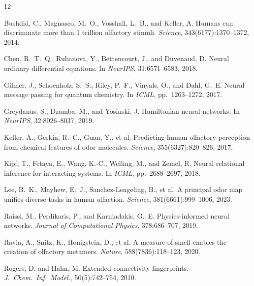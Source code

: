 \documentclass[11pt,a4paper]{article}
\begin{document}
\begin{thebibliography}{12}

Bushdid, C., Magnasco, M.~O., Vosshall, L.~B., and Keller, A.
\newblock Humans can discriminate more than 1 trillion olfactory stimuli.
\newblock \textit{Science}, 343(6177):1370--1372, 2014.

Chen, R.~T.~Q., Rubanova, Y., Bettencourt, J., and Duvenaud, D.
\newblock Neural ordinary differential equations.
\newblock In \textit{NeurIPS}, 31:6571--6583, 2018.

Gilmer, J., Schoenholz, S.~S., Riley, P.~F., Vinyals, O., and Dahl, G.~E.
\newblock Neural message passing for quantum chemistry.
\newblock In \textit{ICML}, pp.~1263--1272, 2017.

Greydanus, S., Dzamba, M., and Yosinski, J.
\newblock Hamiltonian neural networks.
\newblock In \textit{NeurIPS}, 32:8026--8037, 2019.

Keller, A., Gerkin, R.~C., Guan, Y., et al.
\newblock Predicting human olfactory perception from chemical features of odor molecules.
\newblock \textit{Science}, 355(6327):820--826, 2017.

Kipf, T., Fetaya, E., Wang, K.-C., Welling, M., and Zemel, R.
\newblock Neural relational inference for interacting systems.
\newblock In \textit{ICML}, pp.~2688--2697, 2018.

Lee, B.~K., Mayhew, E.~J., Sanchez-Lengeling, B., et al.
\newblock A principal odor map unifies diverse tasks in human olfaction.
\newblock \textit{Science}, 381(6661):999--1006, 2023.

Raissi, M., Perdikaris, P., and Karniadakis, G.~E.
\newblock Physics-informed neural networks.
\newblock \textit{Journal of Computational Physics}, 378:686--707, 2019.

Ravia, A., Snitz, K., Honigstein, D., et al.
\newblock A measure of smell enables the creation of olfactory metamers.
\newblock \textit{Nature}, 588(7836):118--123, 2020.

Rogers, D. and Hahn, M.
\newblock Extended-connectivity fingerprints.
\newblock \textit{J.~Chem.~Inf.~Model.}, 50(5):742--754, 2010.


\end{thebibliography}
\end{document}
